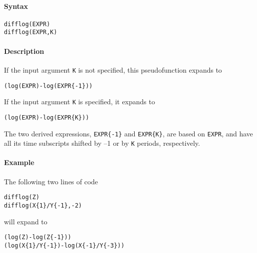 


	\paragraph{Syntax}\label{syntax}

\begin{verbatim}
difflog(EXPR)
difflog(EXPR,K)
\end{verbatim}

\paragraph{Description}\label{description}

If the input argument \texttt{K} is not specified, this pseudofunction
expands to

\begin{verbatim}
(log(EXPR)-log(EXPR{-1}))
\end{verbatim}

If the input argument \texttt{K} is specified, it expands to

\begin{verbatim}
(log(EXPR)-log(EXPR{K}))
\end{verbatim}

The two derived expressions, \texttt{EXPR\{-1\}} and \texttt{EXPR\{K\}},
are based on \texttt{EXPR}, and have all its time subscripts shifted by
--1 or by \texttt{K} periods, respectively.

\paragraph{Example}\label{example}

The following two lines of code

\begin{verbatim}
difflog(Z)
difflog(X{1}/Y{-1},-2)
\end{verbatim}

will expand to

\begin{verbatim}
(log(Z)-log(Z{-1}))
(log(X{1}/Y{-1})-log(X{-1}/Y{-3}))
\end{verbatim}


